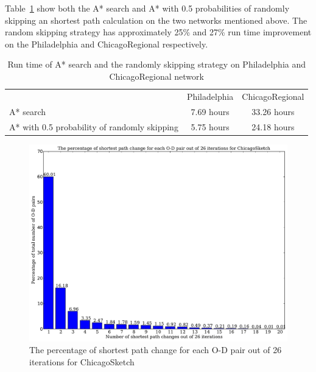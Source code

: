 Table~\ref{table:runtime_large_network} show both the A* search and A* with 0.5 probabilities of randomly skipping an shortest path calculation on the two networks mentioned above.
The random skipping strategy has approximately 25\% and 27\% run time improvement on the Philadelphia and ChicagoRegional respectively.

\begin{table}[H]
    \begin{tabular}{p{} | c c}
        & Philadelphia & ChicagoRegional \\ \cmidrule(lr){2-2} \cmidrule(lr){3-3}
        A* search & 7.69 hours & 33.26 hours \\ 
        A* with 0.5 probability of randomly skipping & 5.75 hours & 24.18 hours\\
    \end{tabular}
    \caption{Run time of A* search and the randomly skipping strategy on Philadelphia and ChicagoRegional network}
    \label{table:runtime_large_network}
\end{table}


\begin{figure}[H]
    \centering
    \includegraphics[width=\textwidth]{img/sp_change}
    \caption{The percentage of shortest path change for each O-D pair out of 26 iterations for ChicagoSketch}
    \label{fig:sp_change}
\end{figure}

